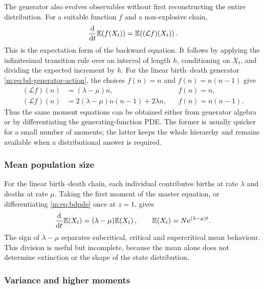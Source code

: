 The generator also evolves observables without first reconstructing the entire
distribution.  For a suitable function $f$ and a non-explosive chain,
\begin{equation}
  \frac{\mathrm{d}}{\mathrm{d} t}\mathbb{E}\!\left(f(X_t)\right)=\mathbb{E}\!\left((\mathcal Lf)(X_t)\right).
  \label{m:eq:generator-expectation}
\end{equation}
This is the expectation form of the backward equation.  It follows by applying
the infinitesimal transition rule over an interval of length $h$, conditioning on
$X_t$, and dividing the expected increment by $h$.  For the linear birth--death
generator \cref{m:eq:bd-generator-action}, the choices $f(n)=n$ and
$f(n)=n(n-1)$ give
\begin{align}
  (\mathcal Lf)(n)&=(\lambda-\mu)n,
  && f(n)=n,\label{m:eq:generator-first-action}\\
  (\mathcal Lf)(n)&=2(\lambda-\mu)n(n-1)+2\lambda n,
  && f(n)=n(n-1).
  \label{m:eq:generator-second-action}
\end{align}
Thus the same moment equations can be obtained either from generator algebra or
by differentiating the generating-function PDE.  The former is usually quicker
for a small number of moments; the latter keeps the whole hierarchy and remains
available when a distributional answer is required.

\subsubsection{Mean population size}\label{m:sec:ct-mean}

For the linear birth--death chain, each individual contributes births at rate
$\lambda$ and deaths at rate $\mu$.  Taking the first moment of the master equation,
or differentiating \cref{m:eq:bdpde} once at $z=1$, gives
\begin{equation}
  \frac{\mathrm{d}}{\mathrm{d} t}\mathbb{E}\!\left(X_t\right)=(\lambda-\mu)\mathbb{E}\!\left(X_t\right),
  \qquad
  \mathbb{E}\!\left(X_t\right)=N\mathrm{e}^{(\lambda-\mu)t}.
  \label{m:eq:bdmean}
\end{equation}
The sign of $\lambda-\mu$ separates subcritical, critical and supercritical mean
behaviour.  This division is useful but incomplete, because the mean alone does not
determine extinction or the shape of the state distribution.

\subsubsection{Variance and higher moments}\label{m:sec:ct-higher-moments}


